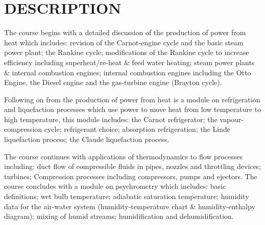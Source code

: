 \documentclass[12pts,a4paper,amsmath,amssymb,floatfix]{article}%
\begin{document}
\section{DESCRIPTION}
The course begins with a detailed discussion of the production of power from heat which includes: revision of the Carnot-engine cycle and the basic steam power plant; the Rankine cycle; modifications of the Rankine cycle to increase efficiency including superheat/re-heat $\&$ feed water heating; steam power plants $\&$ internal combustion engines; internal combustion engines including the Otto Engine, the Diesel engine and the gas-turbine engine (Brayton cycle).  

Following on from the production of power from heat is a module on refrigeration and liquefaction processes which use power to move heat from low temperature to high temperature, this module includes: the Carnot refrigerator; the vapour-compression cycle; refrigerant choice; absorption refrigeration; the Linde liquefaction process; the Claude liquefaction process.  

The course continues with applications of thermodynamics to flow processes including: duct flow of compressible fluids in pipes, nozzles and throttling devices; turbines; Compression processes including compressors, pumps and ejectors. The course concludes with a module on psychrometry which includes: basic definitions; wet bulb temperature; adiabatic saturation temperature; humidity data for the air-water system (humidity-temperature chart $\&$ humidity-enthalpy diagram); mixing of humid streams; humidification and dehumidification.




\end{document}
